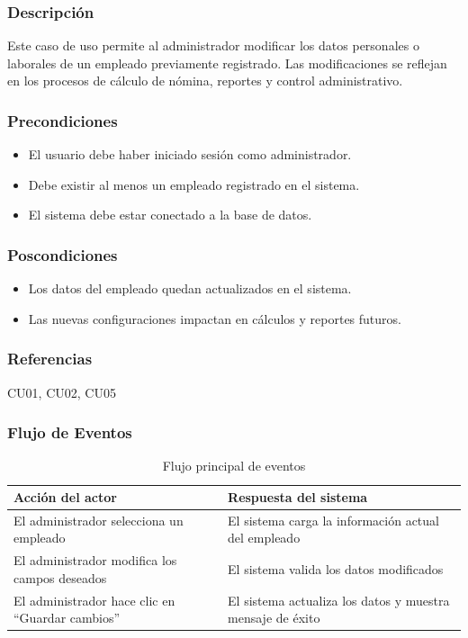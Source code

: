 \subsubsection*{Descripción}
Este caso de uso permite al administrador modificar los datos personales o laborales de un empleado previamente registrado. Las modificaciones se reflejan en los procesos de cálculo de nómina, reportes y control administrativo.

\subsubsection*{Precondiciones}
\begin{itemize}
	\item El usuario debe haber iniciado sesión como administrador.
	\item Debe existir al menos un empleado registrado en el sistema.
	\item El sistema debe estar conectado a la base de datos.
\end{itemize}

\subsubsection*{Poscondiciones}
\begin{itemize}
	\item Los datos del empleado quedan actualizados en el sistema.
	\item Las nuevas configuraciones impactan en cálculos y reportes futuros.
\end{itemize}

\subsubsection*{Referencias}
CU01, CU02, CU05

\clearpage

\subsubsection*{Flujo de Eventos}
\begin{table}[h]
	\centering
	\caption{Flujo principal de eventos}
	\begin{tabular}{|p{7cm}|p{7cm}|}
		\hline
		\textbf{Acción del actor}                       & \textbf{Respuesta del sistema}                            \\ \hline
		El administrador selecciona un empleado         & El sistema carga la información actual del empleado       \\ \hline
		El administrador modifica los campos deseados   & El sistema valida los datos modificados                   \\ \hline
		El administrador hace clic en “Guardar cambios” & El sistema actualiza los datos y muestra mensaje de éxito \\ \hline
	\end{tabular}
\end{table}

